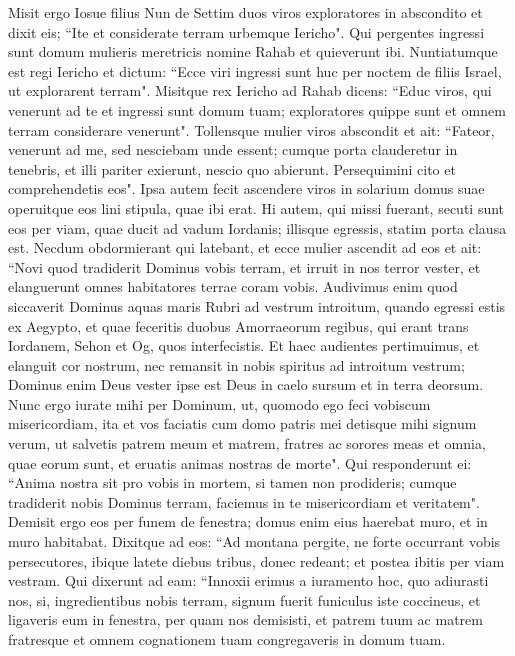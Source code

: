 \begin{biblechapter}  
\verse Misit ergo Iosue filius Nun de Settim duos viros exploratores in abscondito et dixit eis; “Ite et considerate terram urbemque Iericho". Qui pergentes ingressi sunt domum mulieris meretricis nomine Rahab et quieverunt ibi. 
\verse Nuntiatumque est regi Iericho et dictum: “Ecce viri ingressi sunt huc per noctem de filiis Israel, ut explorarent terram". 
\verse Misitque rex Iericho ad Rahab dicens: “Educ viros, qui venerunt ad te et ingressi sunt domum tuam; exploratores quippe sunt et omnem terram considerare venerunt". 
\verse Tollensque mulier viros abscondit et ait: “Fateor, venerunt ad me, sed nesciebam unde essent; 
\verse cumque porta clauderetur in tenebris, et illi pariter exierunt, nescio quo abierunt. Persequimini cito et comprehendetis eos". 
\verse Ipsa autem fecit ascendere viros in solarium domus suae operuitque eos lini stipula, quae ibi erat. 
\verse Hi autem, qui missi fuerant, secuti sunt eos per viam, quae ducit ad vadum Iordanis; illisque egressis, statim porta clausa est. 
\verse Necdum obdormierant qui latebant, et ecce mulier ascendit ad eos et ait: 
\verse “Novi quod tradiderit Dominus vobis terram, et irruit in nos terror vester, et elanguerunt omnes habitatores terrae coram vobis. 
\verse Audivimus enim quod siccaverit Dominus aquas maris Rubri ad vestrum introitum, quando egressi estis ex Aegypto, et quae feceritis duobus Amorraeorum regibus, qui erant trans Iordanem, Sehon et Og, quos interfecistis. 
\verse Et haec audientes pertimuimus, et elanguit cor nostrum, nec remansit in nobis spiritus ad introitum vestrum; Dominus enim Deus vester ipse est Deus in caelo sursum et in terra deorsum.  
\verse Nunc ergo iurate mihi per Dominum, ut, quomodo ego feci vobiscum misericordiam, ita et vos faciatis cum domo patris mei detisque mihi signum verum, 
\verse ut salvetis patrem meum et matrem, fratres ac sorores meas et omnia, quae eorum sunt, et eruatis animas nostras de morte". 
\verse Qui responderunt ei: “Anima nostra sit pro vobis in mortem, si tamen non prodideris; cumque tradiderit nobis Dominus terram, faciemus in te misericordiam et veritatem". 
\verse Demisit ergo eos per funem de fenestra; domus enim eius haerebat muro, et in muro habitabat. 
\verse Dixitque ad eos: “Ad montana pergite, ne forte occurrant vobis persecutores, ibique latete diebus tribus, donec redeant; et postea ibitis per viam vestram. 
\verse Qui dixerunt ad eam: “Innoxii erimus a iuramento hoc, quo adiurasti nos, 
\verse si, ingredientibus nobis terram, signum fuerit funiculus iste coccineus, et ligaveris eum in fenestra, per quam nos demisisti, et patrem tuum ac matrem fratresque et omnem cognationem tuam congregaveris in domum tuam.  

\end{biblechapter}
